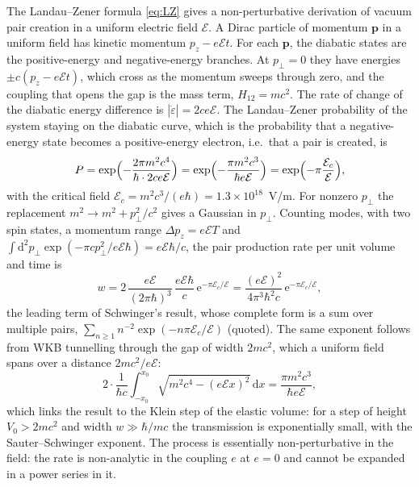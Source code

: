 \documentclass[11pt,a4paper]{book}
\numberwithin{equation}{chapter}
\newcommand{\dd}{\mathrm{d}}
\newcommand{\ee}{\mathrm{e}}
\begin{document}
The Landau--Zener formula \eqref{eq:LZ} gives a non-perturbative derivation of
vacuum pair creation in a uniform electric field $\mathcal E$. A Dirac particle of
momentum $\bm p$ in a uniform field has kinetic momentum $p_z-e\mathcal Et$. For
each $\bm p$, the diabatic states are the positive-energy and negative-energy
branches. At $p_\perp=0$ they have energies $\pm c(p_z-e\mathcal Et)$, which cross
as the momentum sweeps through zero, and the coupling that opens the gap is the
mass term, $H_{12}=mc^2$. The rate of change of the diabatic energy difference is
$|\dot\varepsilon|=2ce\mathcal E$. The Landau--Zener probability of the system
staying on the diabatic curve, which is the probability that a negative-energy
state becomes a positive-energy electron, i.e.\ that a pair is created, is
\begin{equation}\label{eq:LZ-pair}
  P=\exp\Bigl(-\frac{2\pi m^2c^4}{\hbar\cdot2ce\mathcal E}\Bigr)
   =\exp\Bigl(-\frac{\pi m^2c^3}{\hbar e\mathcal E}\Bigr)=\exp\Bigl(-\pi\frac{\mathcal E_c}{\mathcal E}\Bigr),
\end{equation}
with the critical field $\mathcal E_c=m^2c^3/(e\hbar)=1.3\times10^{18}$~V/m. For
nonzero $p_\perp$ the replacement $m^2\to m^2+p_\perp^2/c^2$ gives a Gaussian in
$p_\perp$. Counting modes, with two spin states, a momentum range $\Delta p_z=e\mathcal ET$ and
$\int\dd^2p_\perp\exp(-\pi cp_\perp^2/e\mathcal E\hbar)=e\mathcal E\hbar/c$, the pair
production rate per unit volume and time is
\begin{equation}\label{eq:schwinger}
  w=2\,\frac{e\mathcal E}{(2\pi\hbar)^3}\,\frac{e\mathcal E\hbar}{c}\,\ee^{-\pi\mathcal E_c/\mathcal E}
   =\frac{(e\mathcal E)^2}{4\pi^3\hbar^2c}\,\ee^{-\pi\mathcal E_c/\mathcal E},
\end{equation}
the leading term of Schwinger's result, whose complete form is a sum over
multiple pairs, $\sum_{n\ge1}n^{-2}\exp(-n\pi\mathcal E_c/\mathcal E)$ (quoted).
The same exponent follows from WKB tunnelling through the gap of width
$2mc^2$, which a uniform field spans over a distance $2mc^2/e\mathcal E$:
\begin{equation}
  2\cdot\frac{1}{\hbar c}\int_{-x_0}^{x_0}\!\sqrt{m^2c^4-(e\mathcal Ex)^2}\,\dd x
  =\frac{\pi m^2c^3}{\hbar e\mathcal E},
\end{equation}
which links the result to the Klein step of the elastic volume: for a step of
height $V_0>2mc^2$ and width $w\gg\hbar/mc$ the transmission is exponentially
small, with the Sauter--Schwinger exponent. The process is essentially
non-perturbative in the field: the rate is non-analytic in the coupling $e$ at
$e=0$ and cannot be expanded in a power series in it.
\end{document}
